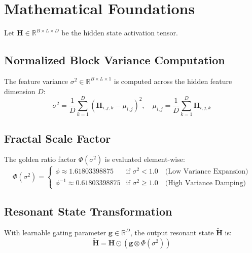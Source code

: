 \section{Mathematical Foundations}
Let $\mathbf{H} \in \mathbb{R}^{B \times L \times D}$ be the hidden state activation tensor.

\subsection{Normalized Block Variance Computation}
The feature variance $\sigma^2 \in \mathbb{R}^{B \times L \times 1}$ is computed across the hidden feature dimension $D$:
\begin{equation}
    \sigma^2 = \frac{1}{D} \sum_{k=1}^D \left( \mathbf{H}_{i,j,k} - \mu_{i,j} \right)^2, \quad \mu_{i,j} = \frac{1}{D} \sum_{k=1}^D \mathbf{H}_{i,j,k}
\end{equation}

\subsection{Fractal Scale Factor}
The golden ratio factor $\Phi(\sigma^2)$ is evaluated element-wise:
\begin{equation}
    \Phi(\sigma^2) = \begin{cases} 
        \phi \approx 1.61803398875 & \text{if } \sigma^2 < 1.0 \quad \text{(Low Variance Expansion)} \\ 
        \phi^{-1} \approx 0.61803398875 & \text{if } \sigma^2 \ge 1.0 \quad \text{(High Variance Damping)} 
    \end{cases}
\end{equation}

\subsection{Resonant State Transformation}
With learnable gating parameter $\mathbf{g} \in \mathbb{R}^D$, the output resonant state $\tilde{\mathbf{H}}$ is:
\begin{equation}
    \tilde{\mathbf{H}} = \mathbf{H} \odot \left( \mathbf{g} \otimes \Phi(\sigma^2) \right)
\end{equation}